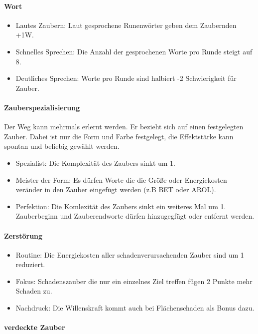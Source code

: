 \documentclass{article}
\begin{document}
\paragraph{Wort}

\begin{itemize}
\item Lautes Zaubern: Laut gesprochene Runenwörter geben dem Zaubernden +1W.
\item Schnelles Sprechen: Die Anzahl der gesprochenen Worte pro Runde steigt auf 8.
\item Deutliches Sprechen: Worte pro Runde sind halbiert -2 Schwierigkeit für Zauber.
\end{itemize}

\paragraph{Zauberspezialisierung}

Der Weg kann mehrmals erlernt werden. Er bezieht sich auf einen festgelegten Zauber. Dabei ist nur die Form und
Farbe festgelegt, die Effektstärke kann spontan und beliebig gewählt werden.

\begin{itemize}
\item Spezialist: Die Komplexität des Zaubers sinkt um 1.
\item Meister der Form: Es dürfen Worte die die Größe oder Energiekosten veränder in den Zauber eingefügt werden (z.B BET oder AROL).
\item Perfektion: Die Komlexität des Zaubers sinkt ein weiteres Mal um 1. Zauberbeginn und Zauberendworte dürfen hinzugegfügt oder entfernt werden.
\end{itemize}

\paragraph{Zerstörung}

\begin{itemize}
\item Routine: Die Energiekosten aller schadenverursachenden Zauber sind um 1 reduziert.
\item Fokus: Schadenszauber die nur ein einzelnes Ziel treffen fügen 2 Punkte mehr Schaden zu.
\item Nachdruck: Die Willenskraft kommt auch bei Flächenschaden als Bonus dazu.
\end{itemize}

\paragraph{verdeckte Zauber}
\end{document}

